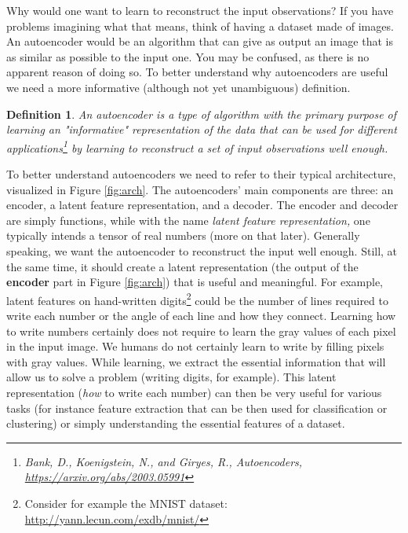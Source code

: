 \documentclass[12pt,a4]{article}
\newenvironment{note}
{\begin{mdframed}[backgroundcolor=light-gray, roundcorner=10pt,leftmargin=1, rightmargin=1, innerleftmargin=15, innertopmargin=15,innerbottommargin=15, outerlinewidth=1, linecolor=light-gray]}
{\end{mdframed}}
\newtheorem{definition}{Definition}
\begin{document}
Why would one want to learn to reconstruct the input observations? If you have problems imagining what that means, think of having a dataset made of images. An autoencoder would be an algorithm that can give as output an image that is as similar as possible to the input one. You may be confused, as there is no apparent reason of doing so. To better understand why autoencoders are useful we need a more informative (although not yet unambiguous) definition.

\begin{note}
\begin{definition}
An autoencoder is a type of algorithm with the primary purpose of learning an "informative" representation of the data that can be used for different applications\footnote{ Bank, D., Koenigstein, N., and Giryes, R., Autoencoders, \url{https://arxiv.org/abs/2003.05991} } by learning to reconstruct a set of input observations well enough.
\end{definition}
\end{note}

To better understand autoencoders we need to refer to their typical architecture, visualized in Figure \ref{fig:arch}. The autoencoders' main components are three: an encoder, a latent feature representation, and a decoder. The encoder and decoder are simply functions, while with the name \textit{latent feature representation,} one typically intends a tensor of real numbers (more on that later). Generally speaking, we want the autoencoder to reconstruct the input well enough. Still, at the same time, it should create a latent representation (the output of the \textbf{encoder} part in Figure \ref{fig:arch}) that is useful and meaningful. For example, latent features on hand-written digits\footnote{ Consider for example the MNIST dataset: \url{http://yann.lecun.com/exdb/mnist/}} could be the number of lines required to write each number or the angle of each line and how they connect. Learning how to write numbers certainly does not require to learn the gray values of each pixel in the input image. We humans do not certainly learn to write by filling pixels with gray values. While learning, we extract the essential information that will allow us to solve a problem (writing digits, for example). This latent representation (\textit{how} to write each number) can then be very useful for various tasks (for instance feature extraction that can be then used for classification or clustering) or simply understanding the essential features of a dataset.
\end{document}
